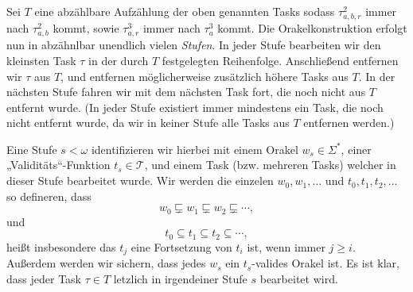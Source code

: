 Sei $T$ eine abzählbare Aufzählung der oben genannten Tasks sodass $\tau^2_{a,b,r}$ immer nach $\tau^2_{a,b}$ kommt, sowie $\tau^3_{a,r}$ immer nach $\tau^3_a$ kommt.
Die Orakelkonstruktion erfolgt nun in abzähnlbar unendlich vielen \emph{Stufen}. In jeder Stufe bearbeiten wir den kleinsten Task $\tau$ in der durch $T$ festgelegten Reihenfolge. Anschließend entfernen wir $\tau$ aus $T$, und entfernen möglicherweise zusätzlich höhere Tasks aus $T$.
In der nächsten Stufe fahren wir mit dem nächsten Task fort, die noch nicht aus $T$ entfernt wurde. (In jeder Stufe existiert immer mindestens ein Task, die noch nicht entfernt wurde, da wir in keiner Stufe alle Tasks aus $T$ entfernen werden.)

Eine Stufe $s<\omega$ identifizieren wir hierbei mit einem Orakel $w_s\in\Sigma^*$, einer „Validitäts“-Funktion $t_s\in\mathcal T$, und einem Task (bzw. mehreren Tasks) welcher in dieser Stufe bearbeitet wurde.
Wir werden die einzelen $w_0, w_1, \dots$ und $t_0, t_1, t_2, \dots$ so defineren, dass
\[ w_0\sqsubsetneq w_1 \sqsubsetneq w_2 \sqsubsetneq \cdots, \]
und 
\[ t_0 \subseteq t_1 \subseteq t_2 \subseteq \cdots, \]
heißt insbesondere das $t_j$ eine Fortsetzung von $t_i$ ist, wenn immer $j\geq i$.
Außerdem werden wir sichern, dass jedes $w_s$ ein $t_s$-valides Orakel ist.
Es ist klar, dass jeder Task $\tau\in T$ letzlich in irgendeiner Stufe $s$ bearbeitet wird.


